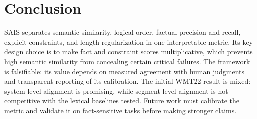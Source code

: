 \documentclass[11pt]{article}
\begin{document}
\section{Conclusion}

SAIS separates semantic similarity, logical order, factual precision and
recall, explicit constraints, and length regularization in one interpretable
metric. Its key design choice is to make fact and constraint scores
multiplicative, which prevents high semantic similarity from concealing certain
critical failures. The framework is falsifiable: its value depends on measured
agreement with human judgments and transparent reporting of its calibration.
The initial WMT22 result is mixed: system-level alignment is promising, while
segment-level alignment is not competitive with the lexical baselines tested.
Future work must calibrate the metric and validate it on fact-sensitive tasks
before making stronger claims.



\end{document}
